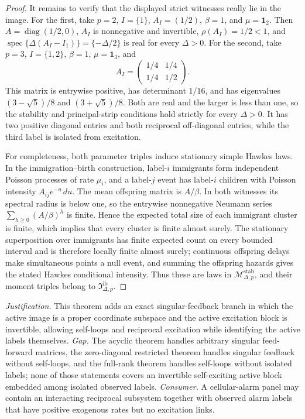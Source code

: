 \documentclass{article}
\begin{document}
\begin{proof}
It remains to verify that the displayed strict witnesses really lie in the image.  For the first, take \(p=2\), \(I=\{1\}\), \(A_I=(1/2)\), \(\beta=1\), and \(\mu=\mathbf1_2\).  Then \(A=\operatorname{diag}(1/2,0)\), \(A_I\) is nonnegative and invertible, \(\rho(A_I)=1/2<1\), and \(\operatorname{spec}\{\Delta(A_I-I_1)\}=\{-\Delta/2\}\) is real for every \(\Delta>0\).  For the second, take \(p=3\), \(I=\{1,2\}\), \(\beta=1\), \(\mu=\mathbf1_3\), and
\[
 A_I=\begin{pmatrix}1/4&1/4\\1/4&1/2\end{pmatrix}.
\tag{18}
\]
This matrix is entrywise positive, has determinant \(1/16\), and has eigenvalues \((3-\sqrt5)/8\) and \((3+\sqrt5)/8\).  Both are real and the larger is less than one, so the stability and principal-strip conditions hold strictly for every \(\Delta>0\).  It has two positive diagonal entries and both reciprocal off-diagonal entries, while the third label is isolated from excitation.

For completeness, both parameter triples induce stationary simple Hawkes laws.  In the immigration--birth construction, label-\(i\) immigrants form independent Poisson processes of rate \(\mu_i\), and a label-\(j\) event has label-\(i\) children with Poisson intensity \(A_{ij}e^{-u}\,du\).  The mean offspring matrix is \(A/\beta\).  In both witnesses its spectral radius is below one, so the entrywise nonnegative Neumann series \(\sum_{h\geq0}(A/\beta)^h\) is finite.  Hence the expected total size of each immigrant cluster is finite, which implies that every cluster is finite almost surely.  The stationary superposition over immigrants has finite expected count on every bounded interval and is therefore locally finite almost surely; continuous offspring delays make simultaneous points a null event, and summing the offspring hazards gives the stated Hawkes conditional intensity.  Thus these are laws in \(\mathcal M_{\Delta,p}^{\mathrm{stab}}\), and their moment triples belong to \(\mathfrak I_{\Delta,p}^{\mathrm{ib}}\).
\end{proof}
\par\smallskip\noindent \textit{Justification.} This theorem adds an exact singular-feedback branch in which the active image is a proper coordinate subspace and the active excitation block is invertible, allowing self-loops and reciprocal excitation while identifying the active labels themselves. \textit{Gap.} The acyclic theorem handles arbitrary singular feed-forward matrices, the zero-diagonal restricted theorem handles singular feedback without self-loops, and the full-rank theorem handles self-loops without isolated labels; none of those statements covers an invertible self-exciting active block embedded among isolated observed labels. \textit{Consumer.} A cellular-alarm panel may contain an interacting reciprocal subsystem together with observed alarm labels that have positive exogenous rates but no excitation links.
\end{document}
